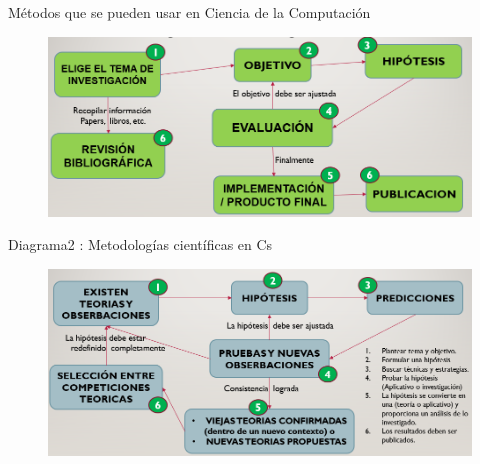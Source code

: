\begin{frame}{Métodos que se pueden usar en Ciencia de la Computación}
\begin{figure}[H]
    \includegraphics[scale=0.48]{images/figura3.PNG}
    \label{fig:boat1}
\end{figure}     
\end{frame}

\begin{frame}{Diagrama2 : Metodologías científicas en Cs}
 \begin{figure}[H]
    \includegraphics[scale=0.48]{images/figura5.PNG}
    \label{fig:boat1}
\end{figure}    
\end{frame}